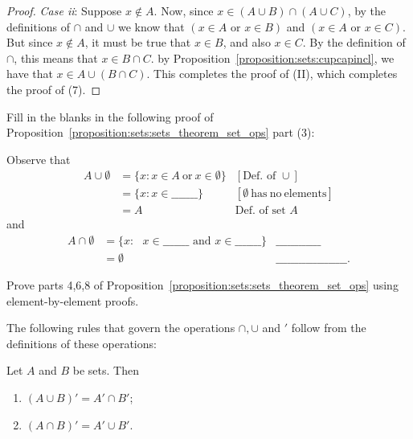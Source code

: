 \begin{proof}
\noindent
\emph{Case ii}:  Suppose $x \not\in  A$. Now, since $x \in (A \cup B) \cap (A \cup C)$, by the definitions of $\cap$ and $\cup$ we know that $(x \in A \text{ or } x \in B)$ and $(x \in A \text{ or } x \in C)$. But since  $x \not\in  A$, it must be true that $x\in B$, and also $x\in C$. By the definition of $\cap$, this means that $x\in B \cap C$. by Proposition~\ref{proposition:sets:cupcapincl}, we have that  $x \in A \cup (B \cap C)$. This completes the proof of (II), which completes the proof of (7).
\end{proof}

\begin{exercise}{}
Fill in the blanks in the following proof of Proposition~\ref{proposition:sets:sets_theorem_set_ops} part (3):

\medskip{}
\noindent
Observe that
\begin{align*}
A \cup \emptyset & =  \{ x : x \in A \mathrm{~or~}x \in \emptyset \}    & [\text{Def. of }\cup] \\
& = \{ x : x \in \_\_\_\_\_\_\_ \}     & [\emptyset \mathrm{~has~no~elements}] \\
& =  A & \text{Def. of set }A 
\end{align*}
and
\begin{align*}
A \cap \emptyset & =  \{ x : \mbox{ $x \in \_\_\_\_\_\_\_$ and $x \in \_\_\_\_\_\_\_$} \}     & \_\_\_\_\_\_\_\_\_\_\_\_ \\
& =  \emptyset     & \_\_\_\_\_\_\_\_\_\_\_\_\_\_\_\_\_\_\_ .
\end{align*}
\end{exercise}

\begin{exercise}{26}
Prove parts 4,6,8 of Proposition~\ref{proposition:sets:sets_theorem_set_ops} using element-by-element proofs.
\end{exercise}

\medskip{}
\noindent
The following rules that govern the operations $\cap, \cup$ and $'$  follow from the definitions of these operations:

\begin{thm}\label{sets_de_morgan}
Let $A$ and $B$ be sets. Then 
\begin{enumerate}[(1)]
 \item
$(A \cup B)' = A' \cap B'$; 
 \item
$(A \cap B)' = A' \cup B'$.
 \end{enumerate}
\end{thm}
 
